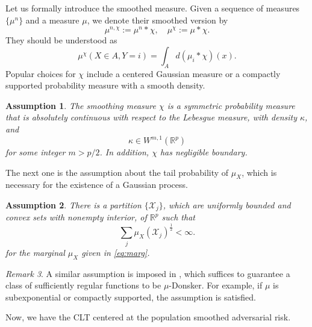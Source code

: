 \documentclass{amsart}
\theoremstyle{plain}
\numberwithin{equation}{section}\newtheorem{theorem}{Theorem}[section]
\newtheorem{assumption}[theorem]{Assumption}
\theoremstyle{remark}
\newtheorem{remark}[theorem]{Remark}
\newcommand{\dk}[1]{{\color{red}[DK: #1]}}
\begin{document}
Let us formally introduce the smoothed measure. Given a sequence of measures $\{\mu^n\}$ and a measure $\mu$, we denote their smoothed version by 
\[
    \mu^{n, \chi}:=\mu^n * \chi, \quad \mu^{\chi}:=\mu * \chi.
\]
They should be understood as
\[
    \mu^{\chi}(X \in A, Y =i) = \int_A d (\mu_i * \chi)(x).
\]
Popular choices for $\chi$ include a centered Gaussian measure or a compactly supported probability measure with a smooth density. 


\begin{assumption}\label{assumption: smoothing kernel}
The smoothing measure $\chi$ is a symmetric probability measure that is
absolutely continuous with respect to the Lebesgue measure, with density
$\kappa$, and
\[
    \kappa\in W^{m,1}(\mathbb R^p)
\]
for some integer $m>p/2$. In addition, $\chi$ has negligible boundary.
\end{assumption}




The next one is the assumption about the tail probability of $\mu_X$, which is necessary for the existence of a Gaussian process.



\begin{assumption}\label{assumption: measure for empirical process}
There is a partition $\{\mathcal{X}_j\}$, which are uniformly bounded and convex sets with nonempty interior, of $\mathbb{R}^p$ such that 
\[
   \sum_j \mu_X (\mathcal{X}_j)^{\frac{1}{2}} < \infty. 
\]
for the marginal $\mu_X$ given in \eqref{eq:marg}.
\end{assumption}





\begin{remark}
A similar assumption is imposed in \cite[Proposition 3.1]{limit_pWasserstein2024}, which suffices to guarantee a class of sufficiently regular functions to be $\mu$-Donsker. For example, if $\mu$ is subexponential or compactly supported, the assumption is satisfied.
\end{remark}



Now, we have the CLT centered at the population smoothed adversarial risk.
\end{document}
